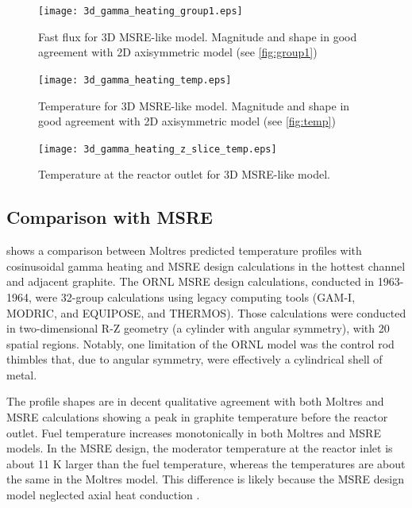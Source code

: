 \documentclass{article}
\let\Oldsubsection\subsection
\renewcommand{\subsection}{\FloatBarrier\Oldsubsection}
\begin{document}
\begin{figure}[htpb]
  \centering
  \texttt{[image: 3d\_gamma\_heating\_group1.eps]}
        \caption{Fast flux for 3D \gls{MSRE}-like model. Magnitude and shape in
          good agreement with 2D axisymmetric model (see \cref{fig:group1})}
  \label{fig:3d_group1}
\end{figure}

\begin{figure}[htpb]
  \centering
  \texttt{[image: 3d\_gamma\_heating\_temp.eps]}
        \caption{Temperature for 3D \gls{MSRE}-like model. Magnitude and shape in
          good agreement with 2D axisymmetric model (see \cref{fig:temp})}
  \label{fig:3d_temp}
\end{figure}

\begin{figure}[htpb]
  \centering
  \texttt{[image: 3d\_gamma\_heating\_z\_slice\_temp.eps]}
        \caption{Temperature at the reactor outlet for 3D \gls{MSRE}-like
          model.}
  \label{fig:3d_temp_fuel_outlet}
\end{figure}



\subsection{Comparison with \gls{MSRE}}

 shows a comparison between Moltres predicted temperature
profiles with cosinusoidal gamma heating and \gls{MSRE} design calculations
\cite{briggs_molten-salt_1964} in the hottest channel and adjacent graphite.
The \gls{ORNL} \gls{MSRE} design calculations, conducted in
1963-1964,  were 32-group calculations using legacy computing tools (GAM-I, MODRIC, and
EQUIPOSE, and THERMOS). Those calculations were conducted in two-dimensional R-Z
geometry (a cylinder with angular symmetry), with 20 spatial regions. Notably,
one limitation of the \gls{ORNL} model was the control rod thimbles that, due to
angular symmetry, were effectively a cylindrical shell of metal.

The profile shapes are in decent qualitative agreement with both Moltres and
\gls{MSRE} calculations showing a peak in graphite temperature before the
reactor outlet. Fuel temperature increases monotonically in both Moltres and
\gls{MSRE} models. In the \gls{MSRE} design, the moderator
temperature at the reactor inlet is about 11 K larger than the
fuel temperature, whereas the temperatures are about the same in the Moltres
model. This difference is likely because the \gls{MSRE} design model
neglected axial heat conduction \cite[p. 99]{briggs_molten-salt_1964}.
\end{document}
